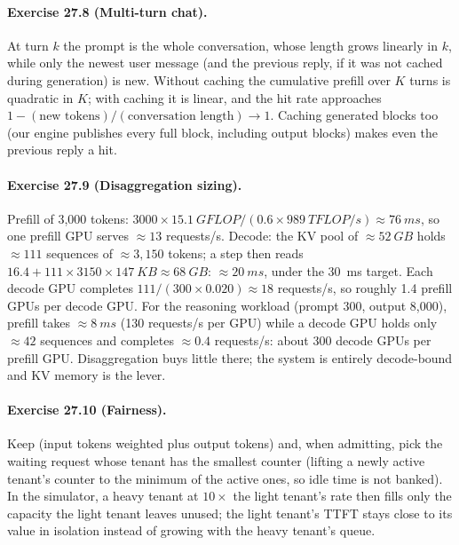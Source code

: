 \paragraph{Exercise 27.8 (Multi-turn chat).}
At turn $k$ the prompt is the whole conversation, whose length grows linearly in $k$, while only the newest
user message (and the previous reply, if it was not cached during generation) is new. Without caching the
cumulative prefill over $K$ turns is quadratic in $K$; with caching it is linear, and the hit rate
approaches $1-(\text{new tokens})/(\text{conversation length})\to1$. Caching generated blocks too (our
engine publishes every full block, including output blocks) makes even the previous reply a hit.

\paragraph{Exercise 27.9 (Disaggregation sizing).}
Prefill of 3,000 tokens: $3000\times\SI{15.1}{GFLOP}/(0.6\times\SI{989}{TFLOP/s})\approx\SI{76}{ms}$, so one prefill GPU
serves $\approx13$ requests/s. Decode: the KV pool of $\approx\SI{52}{GB}$ holds $\approx111$ sequences of
$\approx3{,}150$ tokens; a step then reads $16.4+111\times3150\times\SI{147}{KB}\approx\SI{68}{GB}$:
$\approx\SI{20}{ms}$, under the \SI{30}{ms} target. Each decode GPU completes $111/(300\times0.020)\approx18$
requests/s, so roughly 1.4 prefill GPUs per decode GPU. For the reasoning workload (prompt 300, output
8,000), prefill takes $\approx\SI{8}{ms}$ (130 requests/s per GPU) while a decode GPU holds only $\approx42$
sequences and completes $\approx0.4$ requests/s: about 300 decode GPUs per prefill GPU. Disaggregation buys
little there; the system is entirely decode-bound and KV memory is the lever.

\paragraph{Exercise 27.10 (Fairness).}
Keep  (input tokens weighted plus output tokens) and, when admitting, pick the waiting
request whose tenant has the smallest counter (lifting a newly active tenant's counter to the minimum of the
active ones, so idle time is not banked). In the simulator, a heavy tenant at $10\times$ the light tenant's rate
then fills only the capacity the light tenant leaves unused; the light tenant's TTFT stays close to its
value in isolation instead of growing with the heavy tenant's queue.
